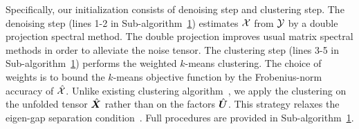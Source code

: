 \documentclass[lettersize,journal]{IEEEtran}
\theoremstyle{definition}
\theoremstyle{definition}
\newcommand{\of}[1]{\left(#1\right)}
\begin{document}
Specifically, our initialization consists of denoising step and clustering step. The denoising step (lines 1-2 in Sub-algorithm~\hyperref[alg:main]{1}) estimates $\mathcal{X}$ from $\mathcal{Y}$ by a double projection spectral method. The double projection improves usual matrix spectral methods in order to alleviate the noise tensor. 
The clustering step (lines 3-5 in Sub-algorithm~\hyperref[alg:main]{1}) performs the weighted $k$-means clustering. 
The choice of weights is to bound the $k$-means objective function by the Frobenius-norm accuracy of $\hat {\mathcal{X}}$. 
Unlike existing clustering algorithm~\citep{ke2019community}, we apply the clustering on the unfolded tensor $\hat {\bm X}$ rather than on the factors $\hat {\bm{U}}$. This strategy relaxes the eigen-gap separation condition~\citep{gao2018community, han2020exact}. 
Full procedures are provided in Sub-algorithm~\hyperref[alg:main]{1}. 
\end{document}

